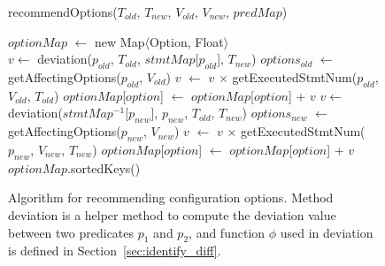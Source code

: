 \begin{figure}[t]
recommendOptions($\mathit{T_{old}}$, $\mathit{T_{new}}$, $\mathit{V_{old}}$, $\mathit{V_{new}}$, $\mathit{predMap}$)\\
\vspace{-4mm}%
\begin{algorithmic}[1]
\STATE $\mathit{optionMap}$ $\leftarrow$ new Map$\langle$Option, Float$\rangle$\\
\STATE $\mathit{v} \leftarrow$ deviation($\mathit{p_{old}}$, $\mathit{T_{old}}$, $\mathit{stmtMap}$[$\mathit{p_{old}}$], $\mathit{T_{new}}$)
\STATE $\mathit{options_{old}}$ $\leftarrow$ getAffectingOptions($\mathit{p_{old}}$, $\mathit{V_{old}}$)
\STATE $\mathit{v}$ $\leftarrow$ $\mathit{v}$ $\times$ getExecutedStmtNum($\mathit{p_{old}}$, $\mathit{V_{old}}$, $\mathit{T_{old}}$)
\STATE $\mathit{optionMap}$[$\mathit{option}$] $\leftarrow$ $\mathit{optionMap}$[$\mathit{option}$] + $\mathit{v}$
\ENDFOR
\ENDFOR
{}
\STATE $\mathit{v} \leftarrow$ deviation($\mathit{stmtMap^{-1}}$[$\mathit{p_{new}}$], $\mathit{p_{new}}$, $\mathit{T_{old}}$, $\mathit{T_{new}}$)
\STATE $\mathit{options_{new}}$ $\leftarrow$ getAffectingOptions($\mathit{p_{new}}$, $\mathit{V_{new}}$)
\STATE $\mathit{v}$ $\leftarrow$ $\mathit{v}$ $\times$ getExecutedStmtNum($\mathit{p_{new}}$, $\mathit{V_{new}}$, $\mathit{T_{new}}$)
\STATE $\mathit{optionMap}$[$\mathit{option}$] $\leftarrow$ $\mathit{optionMap}$[$\mathit{option}$] + $\mathit{v}$
\ENDFOR
\ENDFOR
\RETURN $\mathit{optionMap}$.sortedKeys()
\vspace{-2mm}
\end{algorithmic}
\caption{Algorithm for recommending configuration options.
Method deviation is a helper method to compute the deviation
value between two predicates $\mathit{p_1}$ and $\mathit{p_2}$, and function $\phi$
used in deviation is defined in Section~\ref{sec:identify_diff}.
\label{fig:recommend}
}


\end{figure}

